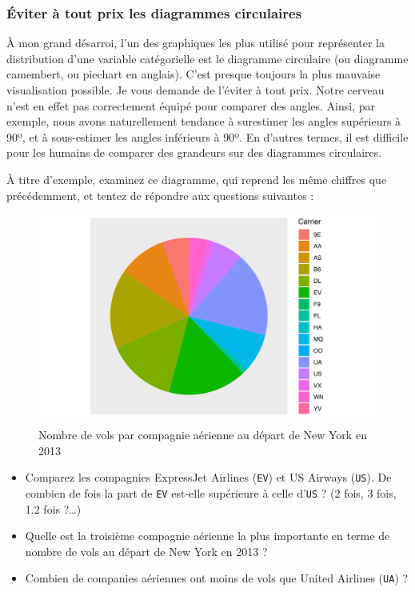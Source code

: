 \documentclass[a4paperpaper,]{article}
\providecommand{\tightlist}{%
  \setlength{\itemsep}{0pt}\setlength{\parskip}{0pt}}
\theoremstyle{definition}
\theoremstyle{definition}
\theoremstyle{definition}
\theoremstyle{remark}
\begin{document}
\hypertarget{eviter-a-tout-prix-les-diagrammes-circulaires}{%
\subsubsection{Éviter à tout prix les diagrammes
circulaires}\label{eviter-a-tout-prix-les-diagrammes-circulaires}}

À mon grand désarroi, l'un des graphiques les plus utilisé pour
représenter la distribution d'une variable catégorielle est le diagramme
circulaire (ou diagramme camembert, ou piechart en anglais). C'est
presque toujours la plus mauvaise visualisation possible. Je vous
demande de l'éviter à tout prix. Notre cerveau n'est en effet pas
correctement équipé pour comparer des angles. Ainsi, par exemple, nous
avons naturellement tendance à surestimer les angles supérieurs à 90º,
et à sous-estimer les angles inférieurs à 90º. En d'autres termes, il
est difficile pour les humains de comparer des grandeurs sur des
diagrammes circulaires.

À titre d'exemple, examinez ce diagramme, qui reprend les même chiffres
que précédemment, et tentez de répondre aux questions suivantes :

\begin{figure}[htpb]

{\centering \includegraphics[width=0.9\linewidth]{figure/piechart-1} 

}

\caption{Nombre de vols par compagnie aérienne au départ de New York en 2013}\label{fig:piechart}
\end{figure}

\begin{itemize}
\tightlist
\item
  Comparez les compagnies ExpressJet Airlines (\texttt{EV}) et US
  Airways (\texttt{US}). De combien de fois la part de \texttt{EV}
  est-elle supérieure à celle d'\texttt{US} ? (2 fois, 3 fois, 1.2 fois
  ?\ldots{})
\item
  Quelle est la troisième compagnie aérienne la plus importante en terme
  de nombre de vols au départ de New York en 2013 ?
\item
  Combien de companies aériennes ont moins de vols que United Airlines
  (\texttt{UA}) ?
\end{itemize}
\end{document}

